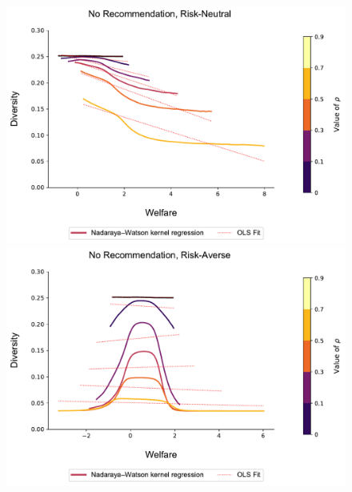 \documentclass[sigconf, anonymous, review]{acmart}
\begin{document}
\begin{figure}[t]
\includegraphics[width=1.05\linewidth]{figures/diversity_welfare_rn.pdf}\\
\includegraphics[width=1.05\linewidth]{figures/diversity_welfare_ra.pdf}\\
\label{fig:diversity_welfare_ra}
\end{figure}
\end{document}
